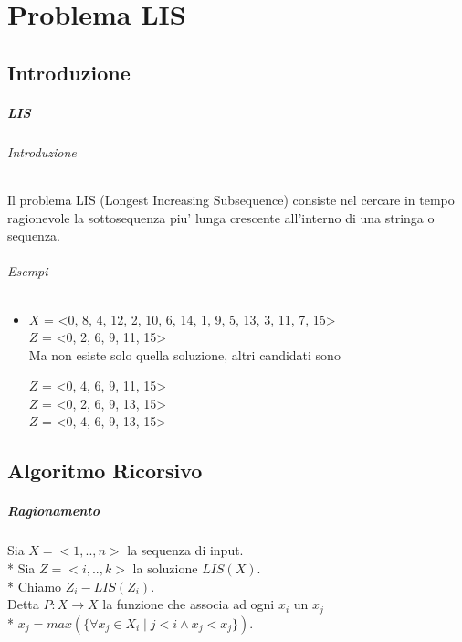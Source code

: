 \chapter{Problema LIS}

\section{Introduzione}

\paragraph{LIS}

\subparagraph{Introduzione}

Il problema LIS (Longest Increasing Subsequence) consiste nel cercare in tempo ragionevole la sottosequenza piu' lunga crescente all'interno di una stringa o sequenza.

\subparagraph{Esempi}

\begin{itemize}

\item

$X$ = <0, 8, 4, 12, 2, 10, 6, 14, 1, 9, 5, 13, 3, 11, 7, 15> \\
$Z$ = <0, 2, 6, 9, 11, 15> \\

Ma non esiste solo quella soluzione, altri candidati sono

$Z$ = <0, 4, 6, 9, 11, 15> \\
$Z$ = <0, 2, 6, 9, 13, 15> \\
$Z$ = <0, 4, 6, 9, 13, 15> \\

\end{itemize}

\section{Algoritmo Ricorsivo}

\paragraph{Ragionamento}

Sia $X = <1,..,n>$ la sequenza di input. \\*
Sia $Z = <i,..,k>$ la soluzione $LIS(X)$. \\*
Chiamo $Z_i - LIS(Z_i)$. \\

Detta $P : X \rightarrow X$ la funzione che associa ad ogni $x_i$ un $x_j$ \\*
$x_j = max(\{\forall x_j \in X_i \mid j < i \land x_j < x_j\})$. \\

